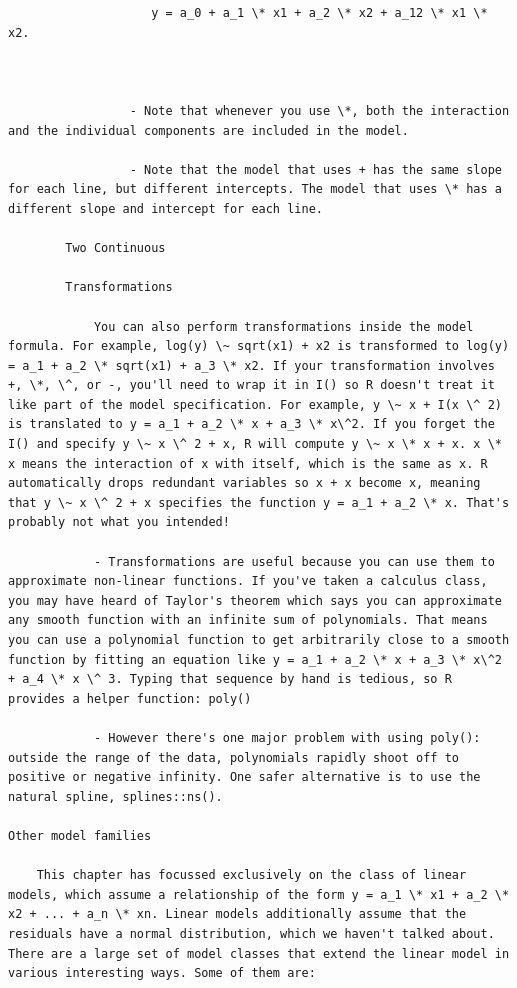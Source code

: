 \documentclass[
]{book}
\begin{document}
\begin{verbatim}
                    y = a_0 + a_1 \* x1 + a_2 \* x2 + a_12 \* x1 \* x2.



                 - Note that whenever you use \*, both the interaction and the individual components are included in the model.

                 - Note that the model that uses + has the same slope for each line, but different intercepts. The model that uses \* has a different slope and intercept for each line.

        Two Continuous

        Transformations

            You can also perform transformations inside the model formula. For example, log(y) \~ sqrt(x1) + x2 is transformed to log(y) = a_1 + a_2 \* sqrt(x1) + a_3 \* x2. If your transformation involves +, \*, \^, or -, you'll need to wrap it in I() so R doesn't treat it like part of the model specification. For example, y \~ x + I(x \^ 2) is translated to y = a_1 + a_2 \* x + a_3 \* x\^2. If you forget the I() and specify y \~ x \^ 2 + x, R will compute y \~ x \* x + x. x \* x means the interaction of x with itself, which is the same as x. R automatically drops redundant variables so x + x become x, meaning that y \~ x \^ 2 + x specifies the function y = a_1 + a_2 \* x. That's probably not what you intended!

            - Transformations are useful because you can use them to approximate non-linear functions. If you've taken a calculus class, you may have heard of Taylor's theorem which says you can approximate any smooth function with an infinite sum of polynomials. That means you can use a polynomial function to get arbitrarily close to a smooth function by fitting an equation like y = a_1 + a_2 \* x + a_3 \* x\^2 + a_4 \* x \^ 3. Typing that sequence by hand is tedious, so R provides a helper function: poly()

            - However there's one major problem with using poly(): outside the range of the data, polynomials rapidly shoot off to positive or negative infinity. One safer alternative is to use the natural spline, splines::ns().

Other model families

    This chapter has focussed exclusively on the class of linear models, which assume a relationship of the form y = a_1 \* x1 + a_2 \* x2 + ... + a_n \* xn. Linear models additionally assume that the residuals have a normal distribution, which we haven't talked about. There are a large set of model classes that extend the linear model in various interesting ways. Some of them are:


\end{verbatim}
\end{document}
